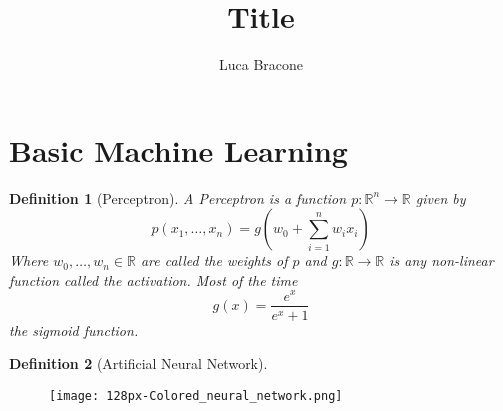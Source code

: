 \documentclass{article}
\title{Title}
\author{Luca Bracone}
\newcommand{\R}{\mathbb{R}}
\newtheorem{definition}{Definition}[section]
\begin{document}
	\maketitle
	\section{Basic Machine Learning}
	\begin{definition}[Perceptron]
		A Perceptron is a function $ p:\R^n \to \R $ given by 
		\[ p(x_1, \dots , x_n) = g \left( w_0 + \sum_{i=1}^{n} w_i x_i \right)  \]
		Where $ w_0, \dots, w_n \in \R $ are called the weights of $p$ and $g:\R \to \R $ is any non-linear function called the activation.
		Most of the time \[ g(x)=\frac{e^x}{e^x+1} \] the sigmoid function.
	\end{definition}
	\begin{definition}[Artificial Neural Network]
		
	\end{definition}
	\begin{figure}
	\texttt{[image: 128px-Colored\_neural\_network.png]}
\end{figure}
\end{document}
